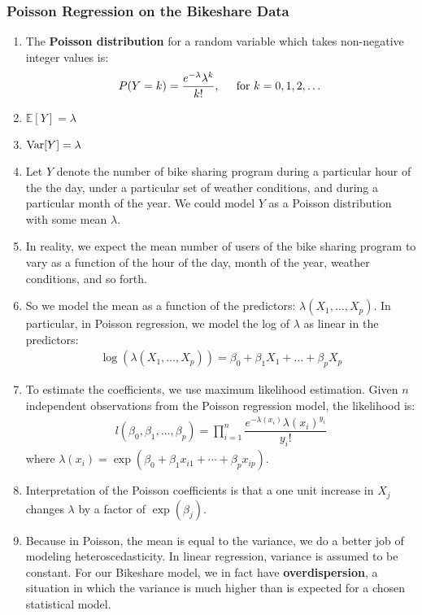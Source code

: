 \documentclass[10pt]{article}
\newcommand{\EE}{{\mathbb{E}}}
\newcommand{\Var}{{\rm Var}}
\begin{document}
\subsubsection{Poisson Regression on the Bikeshare Data} 
\begin{enumerate}
	\item The \textbf{Poisson distribution} for a random variable which takes non-negative integer values is:
	\begin{align*}
		P(Y = k) = \dfrac{e^{-\lambda} \lambda^k}{k!}, \hspace{.2in} \text{for $k = 0, 1, 2, \dots$}
	\end{align*}
	\item $\EE[Y] = \lambda$
	\item $\Var[Y] = \lambda$
	\item Let $Y$ denote the number of bike sharing program during a particular hour of the the day, under a particular set of weather conditions, and during a particular month of the year.  We could model $Y$ as a Poisson distribution with some mean $\lambda$.  
	\item In reality, we expect the mean number of users of the bike sharing program to vary as a function of the hour of the day, month of the year, weather conditions, and so forth.
	\item So we model the mean as a function of the predictors: $\lambda(X_1, \dots, X_p)$.  In particular, in Poisson regression, we model the log of $\lambda$ as linear in the predictors:
	\begin{align*}
		\log(\lambda(X_1, \dots, X_p)) = \beta_0 + \beta_1 X_1 + \dots + \beta_pX_p 
	\end{align*}
	\item To estimate the coefficients, we use maximum likelihood estimation.  Given $n$ independent observations from the Poisson regression model, the likelihood is:
	\begin{align*}
		l(\beta_0, \beta_1, \dots, \beta_p) = \prod_{i = 1}^n \dfrac{e^{-\lambda(x_i)} \lambda(x_i)^{y_i}}{y_i!}
	\end{align*}
	where $\lambda(x_i) = \exp(\beta_0 + \beta_1x_{i1} + \cdots + \beta_px_{ip})$. 
	\item Interpretation of the Poisson coefficients is that a one unit increase in $X_j$ changes $\lambda$ by a factor of $\exp(\beta_j)$.  
	\item Because in Poisson, the mean is equal to the variance, we do a better job of modeling heteroscedasticity.  In linear regression, variance is assumed to be constant.  For our Bikeshare model, we in fact have \textbf{overdispersion}, a situation in which the variance is much higher than is expected for a chosen statistical model.
\end{enumerate}
\end{document}
